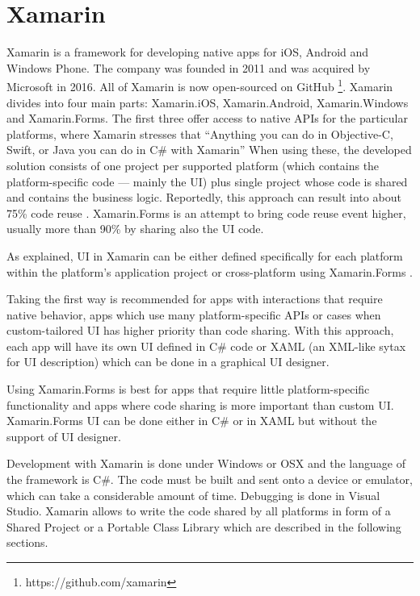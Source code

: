 \section{Xamarin}

Xamarin is a framework for developing native apps for iOS, Android and Windows Phone. The company was founded in 2011 and was acquired by Microsoft in 2016. All of Xamarin is now open-sourced on GitHub \footnote{https://github.com/xamarin}. 
Xamarin divides into four main parts: Xamarin.iOS, Xamarin.Android, Xamarin.Windows and Xamarin.Forms. The first three offer access to native APIs for the particular platforms, where Xamarin stresses that ``Anything you can do in Objective-C, Swift, or Java you can do in C\# with Xamarin'' \cite{xamarin:homepage} When using these, the developed solution consists of one project per supported platform (which contains the platform-specific code --- mainly the UI) plus single project whose code is shared and contains the business logic. Reportedly, this approach can result into about 75\% code reuse \cite{xamarin:codereuse}. Xamarin.Forms is an attempt to bring code reuse event higher, usually more than 90\% \cite{xamarin:codereuse} by sharing also the UI code.

As explained, UI in Xamarin can be either defined specifically for each platform within the platform's application project or cross-platform using Xamarin.Forms \cite{xamarin:forms}.

Taking the first way is recommended for apps with interactions that require native behavior, apps which use many platform-specific APIs or cases when custom-tailored UI has higher priority than code sharing. With this approach, each app will have its own UI defined in C\# code or XAML (an XML-like sytax for UI description) which can be done in a graphical UI designer.

Using Xamarin.Forms is best for apps that require little platform-specific functionality and apps where code sharing is more important than custom UI. Xamarin.Forms UI can be done either in C\# or in XAML but without the support of UI designer.

Development with Xamarin is done under Windows or OSX and the language of the framework is C\#. The code must be built and sent onto a device or emulator, which can take a considerable amount of time. Debugging is done in Visual Studio. Xamarin allows to write the code shared by all platforms in form of a Shared Project or a Portable Class Library \cite{xamarin:sharing_code} which are described in the following sections. 


